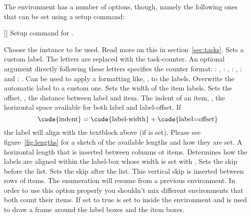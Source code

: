 \documentclass[load-preamble+]{cnltx-doc}
\begin{document}
The environment  has a number of options, though, namely the
following ones that can be set using a setup command:
\begin{commands}
  []
    Setup command for \Tasks.
\end{commands}
\begin{options}
  \Default
     Choose the instance to be used.  Read more on this in
     section~\ref{sec:tasks}.
  \Default
    Sets a custom label.  The letters  are
    replaced with the task-counter.  An optional argument directly following
    these letters specifies the counter format: : ,
    : , : , :  and
    : .
  \Default
    Can be used to apply a formatting like, \eg,
     to the labels.
  \Default
    Overwrite the automatic label to a custom one.
  \Default{1em}
    Sets the width of the item labels.
  \Default{.3333em}
    Sets the offset, \ie, the distance between label and
    item.
  \Default{2.5em}
    The indent of an item, \ie, the horizontal space
    available for both label and label-offset.  If
    \[
      \text{\code{indent}} =
      \text{\code{label-width}} + \text{\code{label=offset}}
    \]
    the label will align with the textblock above (if
     is set).  Please see figure~\ref{fig:lengths}
    for a sketch of the available lengths and how they are set.
  \Default{0pt}
    A horizontal length that is inserted between columns ot
    items.
    Determines how the labels are aligned within the
    label-box whose width is set with .
  \Default{0pt}
    Sets the skip before the list.
  \Default{0pt}
    Sets the skip after the list.
    This vertical skip is inserted between rows of items.
    The enumeration will resume from a previous  environment.  In
    order to use this option properly you shouldn't mix different 
    environments that both count their items.
    If set to true  is set to \code{0pt}
    inside the  environment and  is used to draw a frame
    around the label boxes and the item boxes.
\end{options}
\end{document}
